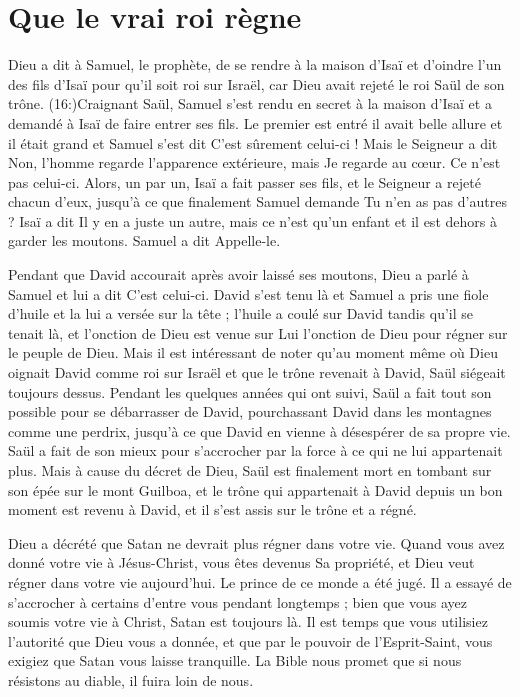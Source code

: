 \section{Que le vrai roi r\`egne}

Dieu a dit à Samuel, le prophète, de se rendre à la maison d'Isaï et d'oindre
 l'un des fils d'Isaï pour qu'il soit roi sur Israël,
 car Dieu avait rejeté le roi Saül de son trône.
 (16:)Craignant Saül,
 Samuel s'est rendu en secret à la maison d'Isaï
 et a demandé à Isaï de faire entrer ses fils.
 Le premier est entré \ocadr il avait belle allure et il était grand \fcadr{}
 et Samuel s'est dit\frcolon{} \Og C'est sûrement celui-ci ! \Fg{}
 Mais le Seigneur a dit\frcolon{} \Og Non, l'homme regarde l'apparence extérieure,
 mais Je regarde au cœur. Ce n'est pas celui-ci. \Fg{}
 Alors, un par un, Isaï a fait passer ses fils, et le Seigneur a rejeté
 chacun d'eux, jusqu'à ce que finalement Samuel demande\frcolon{}
 \Og Tu n'en as pas d'autres ? \Fg{}
 Isaï a dit\frcolon{} \Og Il y en a juste un autre, mais ce n'est qu'un enfant
 et il est dehors à garder les moutons. \Fg{}
 Samuel a dit\frcolon{} \Og Appelle-le. \Fg{}

Pendant que David accourait après avoir laissé ses moutons,
 Dieu a parlé à Samuel et lui a dit\frcolon{} \Og C'est celui-ci. \Fg{}
 David s'est tenu là et Samuel a pris une fiole d'huile
 et la lui a versée sur la tête ; l'huile a coulé sur David
 tandis qu'il se tenait là, et l'onction de Dieu est venue sur Lui
 \ocadr l'onction de Dieu pour régner sur le peuple de Dieu.
 Mais il est intéressant de noter qu'au moment même où Dieu
 oignait David comme roi
 sur Israël et que le trône revenait à David,
 Saül siégeait toujours dessus. Pendant les quelques années qui ont suivi,
 Saül a fait tout son possible pour se débarrasser de David,
 pourchassant David dans les montagnes comme une perdrix,
 jusqu'à ce que David en vienne à désespérer de sa propre vie.
 Saül a fait de son mieux pour s'accrocher par la force à ce qui
 ne lui appartenait plus. Mais à cause du décret de Dieu,
 Saül est finalement mort en tombant sur son épée sur le mont Guilboa,
 et le trône qui appartenait à David depuis un bon moment
 est revenu à David, et il s'est assis sur le trône et a régné.

Dieu a décrété que Satan ne devrait plus régner dans votre vie.
 Quand vous avez donné votre vie à Jésus-Christ, vous êtes devenus
 Sa propriété, et Dieu veut régner dans votre vie aujourd'hui.
 Le prince de ce monde a été jugé. Il a essayé de s'accrocher à certains
 d'entre vous pendant longtemps ; bien que vous ayez soumis votre vie
 à Christ, Satan est toujours là. Il est temps que vous utilisiez
 l'autorité que Dieu vous a donnée, et que par le pouvoir de l'Esprit-Saint,
 vous exigiez que Satan vous laisse tranquille.
 La Bible nous promet que si nous résistons au diable,
 il fuira loin de nous.


